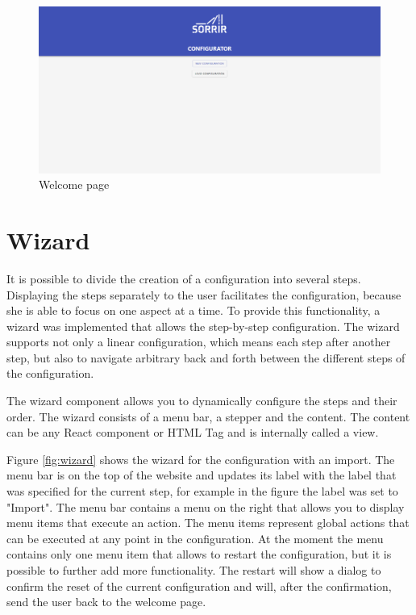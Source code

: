 \begin{figure}[ht]
    \centering
    \includegraphics[width=\textwidth]{img/app_welcome.png}
    \caption{Welcome page}
    \label{fig:app_welcome}
\end{figure}

\section{Wizard}
\label{sec:wizard}
It is possible to divide the creation of a configuration into several steps. Displaying the steps separately to the user facilitates the configuration, because she is able to focus on one aspect at a time. To provide this functionality, a wizard was implemented that allows the step-by-step configuration. The wizard supports not only a linear configuration, which means each step after another step, but also to navigate arbitrary back and forth between the different steps of the configuration. 

The wizard component allows you to dynamically configure the steps and their order. The wizard consists of a menu bar, a stepper and the content. The content can be any React component or HTML Tag and is internally called a view. 

Figure \ref{fig:wizard} shows the wizard for the configuration with an import. The menu bar is on the top of the website and updates its label with the label that was specified for the current step, for example in the figure the label was set to "Import". The menu bar contains a menu on the right that allows you to display menu items that execute an action. The menu items represent global actions that can be executed at any point in the configuration. At the moment the menu contains only one menu item that allows to restart the configuration, but it is possible to further add more functionality. The restart will show a dialog to confirm the reset of the current configuration and will, after the confirmation, send the user back to the welcome page.

